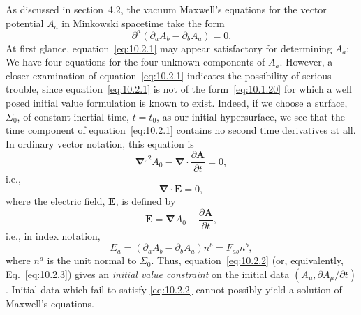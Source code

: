 As discussed in section~4.2, the vacuum Maxwell's equations for the vector potential
\(A_a\) in Minkowski spacetime take the form
\begin{equation}
  \partial^a(\partial_aA_b-\partial_bA_a)=0.
  \tag{10.2.1}\label{eq:10.2.1}
\end{equation}
At first glance, equation~\eqref{eq:10.2.1} may appear satisfactory for determining
\(A_a\): We have four equations for the four unknown components of \(A_a\).
However, a closer examination of equation~\eqref{eq:10.2.1} indicates the
possibility of serious trouble, since equation~\eqref{eq:10.2.1} is not of the
form~\eqref{eq:10.1.20} for which a well posed initial value formulation is known
to exist. Indeed, if we choose a surface, \(\Sigma_0\), of constant inertial time,
\(t=t_0\), as our initial hypersurface, we see that the time component of
equation~\eqref{eq:10.2.1} contains no second time derivatives at all. In ordinary
vector notation, this equation is
\begin{equation}
  \boldsymbol{\nabla}^{,2}A_0
  -\boldsymbol{\nabla}\mathbin{\cdot}\frac{\partial\mathbf{A}}{\partial t}=0,
  \tag{10.2.2}\label{eq:10.2.2}
\end{equation}
i.e.,
\begin{equation}
  \boldsymbol{\nabla}\mathbin{\cdot}\mathbf{E}=0,
  \tag{10.2.3}\label{eq:10.2.3}
\end{equation}
where the electric field, \(\mathbf{E}\), is defined by
\begin{equation}
  \mathbf{E}=\boldsymbol{\nabla} A_0-\frac{\partial\mathbf{A}}{\partial t},
  \tag{10.2.4}\label{eq:10.2.4}
\end{equation}
i.e., in index notation,
\begin{equation}
  E_a=(\partial_aA_b-\partial_bA_a)n^b=F_{ab}n^b,
  \tag{10.2.5}\label{eq:10.2.5}
\end{equation}
where \(n^a\) is the unit normal to \(\Sigma_0\). Thus,
equation~\eqref{eq:10.2.2} (or, equivalently, Eq.~\eqref{eq:10.2.3}) gives an
\emph{initial value constraint} on the initial data
\((A_\mu,\partial A_\mu/\partial t)\). Initial data which fail to satisfy
\eqref{eq:10.2.2} cannot possibly yield a solution of Maxwell's equations.


